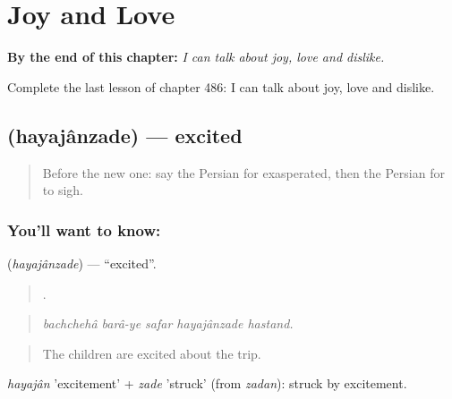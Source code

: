 
\chapter{Joy and Love}
\label{ch:fa-joy-and-love}

\begin{chapteropening}
\textbf{By the end of this chapter:} \emph{I can talk about joy, love and dislike.}

Complete the last lesson of chapter 486: I can talk about joy, love and dislike.
\end{chapteropening}

\section[\texorpdfstring{\fa{هیجان} \fa{زده} (hayajânzade)}{هیجان زده (hayajânzade)}]{  (hayajânzade) — excited}

\label{lesson:FA-C486-hayajanzade}



\begin{quote}
Before the new one: say the Persian for exasperated, then the Persian for to sigh.
\end{quote}

\subsection*{You'll want to know:  }
\textbf{ } (\emph{hayajânzade}) — \textquotedblleft{}excited\textquotedblright{}.

\begin{quote}
      .
\end{quote}

\begin{quote}
\emph{bachchehâ barâ-ye safar hayajânzade hastand.}
\end{quote}

\begin{quote}
The children are excited about the trip.
\end{quote}

\emph{hayajân} 'excitement' + \emph{zade} 'struck' (from \emph{zadan}): struck by excitement.

